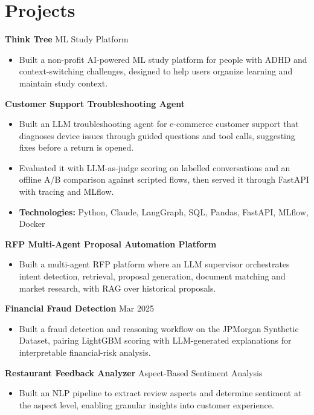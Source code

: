 \documentclass[10pt,a4paper]{article}
\begin{document}
\section{Projects}
\textbf{Think Tree} \textbar{} ML Study Platform\par
\begin{itemize}
  \item Built a non-profit AI-powered ML study platform for people with ADHD and context-switching challenges, designed to help users organize learning and maintain study context.
\end{itemize}
\textbf{Customer Support Troubleshooting Agent}\par
\begin{itemize}
  \item Built an LLM troubleshooting agent for e-commerce customer support that diagnoses device issues through guided questions and tool calls, suggesting fixes before a return is opened.
  \item Evaluated it with LLM-as-judge scoring on labelled conversations and an offline A/B comparison against scripted flows, then served it through FastAPI with tracing and MLflow.
  \item \textbf{Technologies:} Python, Claude, LangGraph, SQL, Pandas, FastAPI, MLflow, Docker
\end{itemize}
\textbf{RFP Multi-Agent Proposal Automation Platform}\par
\begin{itemize}
  \item Built a multi-agent RFP platform where an LLM supervisor orchestrates intent detection, retrieval, proposal generation, document matching and market research, with RAG over historical proposals.
\end{itemize}
\textbf{Financial Fraud Detection} \textbar{} Mar 2025\par
\begin{itemize}
  \item Built a fraud detection and reasoning workflow on the JPMorgan Synthetic Dataset, pairing LightGBM scoring with LLM-generated explanations for interpretable financial-risk analysis.
\end{itemize}
\textbf{Restaurant Feedback Analyzer} \textbar{} Aspect-Based Sentiment Analysis\par
\begin{itemize}
  \item Built an NLP pipeline to extract review aspects and determine sentiment at the aspect level, enabling granular insights into customer experience.
\end{itemize}
\end{document}
